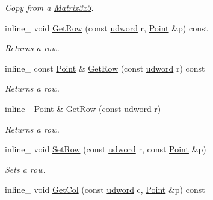 \begin{DoxyCompactItemize}
\begin{DoxyCompactList}\small\item\em Copy from a \hyperlink{classMatrix3x3}{Matrix3x3}. \end{DoxyCompactList}\item 
inline\+\_\+ void \hyperlink{classMatrix3x3_ac0fd6aa5e05e474951995431032f32d2}{Get\+Row} (const \hyperlink{IceTypes_8h_a44c6f1920ba5551225fb534f9d1a1733}{udword} r, \hyperlink{classPoint}{Point} \&p) const \hypertarget{classMatrix3x3_ac0fd6aa5e05e474951995431032f32d2}{}\label{classMatrix3x3_ac0fd6aa5e05e474951995431032f32d2}

\begin{DoxyCompactList}\small\item\em Returns a row. \end{DoxyCompactList}\item 
inline\+\_\+ const \hyperlink{classPoint}{Point} \& \hyperlink{classMatrix3x3_a82a2357d38e6b987e36cec2995b11aa8}{Get\+Row} (const \hyperlink{IceTypes_8h_a44c6f1920ba5551225fb534f9d1a1733}{udword} r) const \hypertarget{classMatrix3x3_a82a2357d38e6b987e36cec2995b11aa8}{}\label{classMatrix3x3_a82a2357d38e6b987e36cec2995b11aa8}

\begin{DoxyCompactList}\small\item\em Returns a row. \end{DoxyCompactList}\item 
inline\+\_\+ \hyperlink{classPoint}{Point} \& \hyperlink{classMatrix3x3_a1ece9d22cf514597b268b3bc129995ff}{Get\+Row} (const \hyperlink{IceTypes_8h_a44c6f1920ba5551225fb534f9d1a1733}{udword} r)\hypertarget{classMatrix3x3_a1ece9d22cf514597b268b3bc129995ff}{}\label{classMatrix3x3_a1ece9d22cf514597b268b3bc129995ff}

\begin{DoxyCompactList}\small\item\em Returns a row. \end{DoxyCompactList}\item 
inline\+\_\+ void \hyperlink{classMatrix3x3_ab27a1b055f5dcd6cb38d2a6291ff7cd4}{Set\+Row} (const \hyperlink{IceTypes_8h_a44c6f1920ba5551225fb534f9d1a1733}{udword} r, const \hyperlink{classPoint}{Point} \&p)\hypertarget{classMatrix3x3_ab27a1b055f5dcd6cb38d2a6291ff7cd4}{}\label{classMatrix3x3_ab27a1b055f5dcd6cb38d2a6291ff7cd4}

\begin{DoxyCompactList}\small\item\em Sets a row. \end{DoxyCompactList}\item 
inline\+\_\+ void \hyperlink{classMatrix3x3_a8d4813c36f57e9b563902989d9e2b86a}{Get\+Col} (const \hyperlink{IceTypes_8h_a44c6f1920ba5551225fb534f9d1a1733}{udword} c, \hyperlink{classPoint}{Point} \&p) const \hypertarget{classMatrix3x3_a8d4813c36f57e9b563902989d9e2b86a}{}\label{classMatrix3x3_a8d4813c36f57e9b563902989d9e2b86a}


\end{DoxyCompactItemize}
